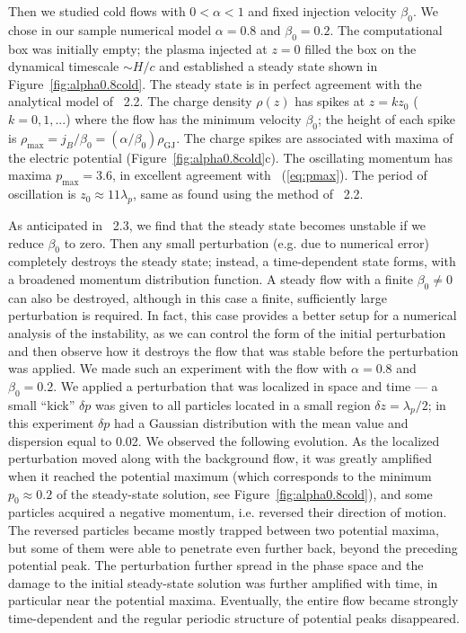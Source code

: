 Then we studied cold flows with $0<\alpha<1$ and fixed injection velocity $\beta_0$.
We chose in our sample numerical model $\alpha=0.8$ and $\beta_0=0.2$.
The computational box was initially empty; the plasma injected at $z=0$
filled the box on the dynamical timescale
$\sim H/c$ and established a steady state shown in Figure~\ref{fig:alpha0.8cold}.
The steady state is in perfect agreement with the analytical model of \Sect~2.2.
The charge density $\rho(z)$ has spikes at $z=kz_0$ ($k=0,1,...$) where
the flow has the minimum velocity $\beta_0$; the height of each spike is
$\rho_{\max}=j_B/\beta_0=(\alpha/\beta_0)\rho_\mathrm{GJ}$.
The charge spikes are associated with maxima of the electric potential (Figure~\ref{fig:alpha0.8cold}c).
The oscillating momentum has maxima $p_{\max}=3.6$, in excellent agreement
with \Eq~(\ref{eq:pmax}). The period of oscillation is $z_0\approx 11\lambda_p$, same
as found using the method of \Sect~2.2.

As anticipated in \Sect~2.3, we find that the steady state becomes unstable if we
reduce $\beta_0$ to zero. Then any small perturbation (e.g. due to numerical error)
completely destroys the steady state; instead, a time-dependent state forms, with a
broadened momentum distribution function.
A steady flow with a finite $\beta_0\neq 0$ can also be destroyed, although in this
case a finite,
sufficiently large perturbation is required. In fact, this case provides a better
setup for a numerical analysis of the instability,
as we can control the form of the initial perturbation and then observe how it destroys
the flow that was stable before the perturbation was applied.
We made such an experiment with the flow with $\alpha=0.8$ and $\beta_0=0.2$.
We applied a perturbation that was localized in space and time --- a small ``kick''
$\delta p$ was given to all particles located in a small region $\delta z=\lambda_p/2$;
in this experiment $\delta p$ had a Gaussian distribution with the mean value and
dispersion equal to 0.02.
We observed the following evolution. As the localized
perturbation moved along with the background flow, it was greatly amplified when it
reached the potential maximum (which corresponds to the minimum $p_0\approx 0.2$
of the steady-state solution,
see Figure~\ref{fig:alpha0.8cold}), and some particles acquired a negative momentum, i.e. reversed their
direction of motion. The reversed particles became mostly trapped between two
potential maxima, but some of them were able to penetrate even further back,
beyond the preceding potential peak. The perturbation further spread in the phase space
and the damage to the initial steady-state solution was further amplified with time,
in particular near the potential maxima.
Eventually, the entire flow became strongly time-dependent
and the regular periodic structure of potential peaks disappeared.

